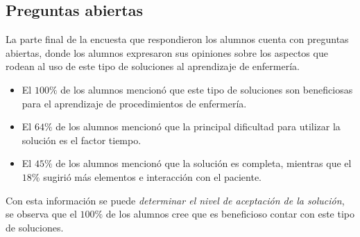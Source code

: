 \subsection{Preguntas abiertas}
\label{sec:res_subjetiva_abiertas}

La parte final de la encuesta que respondieron los alumnos cuenta con preguntas abiertas, 
donde los alumnos expresaron sus
opiniones sobre los aspectos que rodean al uso de este tipo de soluciones al
aprendizaje de enfermería.


\begin{itemize}
    \item El $100\%$ de los alumnos mencionó que este tipo de soluciones son
        beneficiosas para el aprendizaje de procedimientos de enfermería.
    \item El $64\%$ de los alumnos mencionó que la principal dificultad para
        utilizar la solución es el factor tiempo.
    \item El $45\%$ de los alumnos mencionó que la solución es completa,
        mientras que el $18\%$ sugirió más elementos e interacción con el
        paciente.
\end{itemize}


Con esta información se puede \emph{determinar el nivel de aceptación de la
    solución}, se observa que el $100\%$ de los alumnos cree que es beneficioso
contar con este tipo de soluciones.
